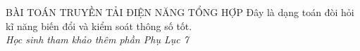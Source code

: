 \begin{dang}{BÀI TOÁN TRUYỀN TẢI ĐIỆN NĂNG TỔNG HỢP}
Đây là dạng toán đòi hỏi kĩ năng biến đổi và kiểm soát thông số tốt.\\ 
\textit{Học sinh tham khảo thêm phần Phụ Lục 7}
\end{dang}